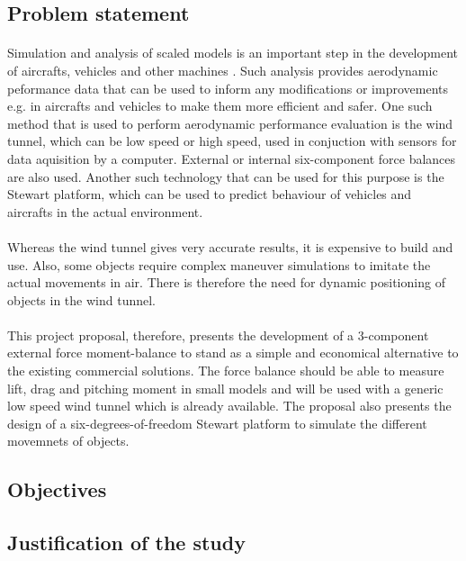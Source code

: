 \subsection{Problem statement}
\paragraph{}Simulation and analysis of scaled models is an important step in the development of aircrafts, vehicles and other machines . Such analysis provides aerodynamic peformance data that can be used to inform any modifications or improvements e.g. in aircrafts and vehicles to make them more efficient and safer. One such method that is used to perform aerodynamic performance evaluation is the wind tunnel, which can be low speed or high speed, used in conjuction with sensors for data aquisition by a computer. External or internal six-component force balances are also used. Another such technology that can be used for this purpose is the Stewart platform, which can be used to predict behaviour of vehicles and aircrafts in the actual environment.
\paragraph{}Whereas the wind tunnel gives very accurate results, it is expensive to build and use. Also, some objects require complex maneuver simulations to imitate the actual movements in air. There is therefore the need for dynamic positioning of objects in the wind tunnel.

\paragraph{}This project proposal, therefore, presents the development of a 3-component external force moment-balance to stand as a simple and economical alternative to the existing commercial solutions. The force balance should be able to measure lift, drag and pitching moment in small models and will be used with a generic low speed wind tunnel which is already available. The proposal also presents the design of a six-degrees-of-freedom Stewart platform to simulate the different movemnets of objects.
\subsection{Objectives}
\subsection{Justification of the study}
